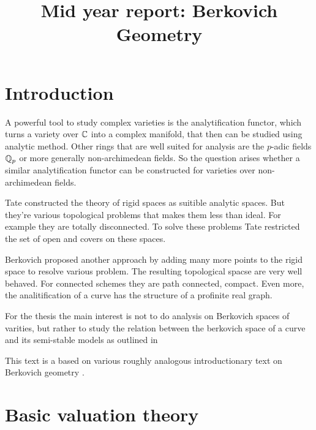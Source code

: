 \documentclass[a4paper]{article}
\title{Mid year report: Berkovich Geometry}
\begin{document}
\maketitle

\listoftodos

\pagebreak

\tableofcontents

\pagebreak


\section{Introduction} \label{sec:introduction}

A powerful tool to study complex varieties is the analytification functor, which turns a variety over $\mathbb{C}$ into a complex manifold, that then can be studied using analytic method. 
Other rings that are well suited for analysis are the $p$-adic fields $\mathbb{Q}_p$ or more generally non-archimedean fields. 
So the question arises whether a similar analytification functor can be constructed for  varieties over non-archimedean fields. 

Tate constructed the theory of rigid spaces as suitible analytic spaces. But they're various topological problems that makes them less than ideal. For example they are totally disconnected. To solve these problems Tate restricted the set of open and covers on these spaces. 

Berkovich proposed another approach by adding many more points to the rigid space to resolve various problem. 
The resulting topological spacse are very well behaved. For connected schemes they are path connected, compact. Even more, the analitification of a curve has the structure of a profinite real graph. 

For the thesis the main interest is not to do analysis on Berkovich spaces of varities, but rather to study the relation between the berkovich space of a curve and its semi-stable models as outlined in \cite{bakerStructureNonarchimedeanAnalytic2013}

This text is a based on various roughly analogous introductionary text on Berkovich geometry \cite{bakerarizona,temkinIntroductionBerkovichAnalytic2010,nicaiseNONARCHIMEDEANGEOMETRY,boschLecturesFormalRigid2014}. 

\section{Basic valuation theory} \label{sec:basic_valuation_theory}
\end{document}
